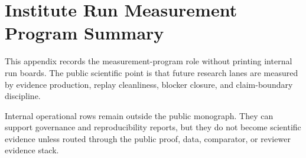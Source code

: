 \section{Institute Run Measurement Program Summary}

\label{sec:oc-core-1-3-institute-run-measurement-program-summary}

This appendix records the measurement-program role without printing internal run boards. The public scientific point is that future research lanes are measured by evidence production, replay cleanliness, blocker closure, and claim-boundary discipline.


Internal operational rows remain outside the public monograph. They can support governance and reproducibility reports, but they do not become scientific evidence unless routed through the public proof, data, comparator, or reviewer evidence stack.
